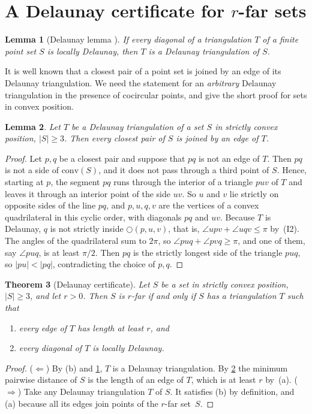 \documentclass[11pt,a4paper]{article}
\newtheorem{theorem}{Theorem}
\newtheorem{lemma}[theorem]{Lemma}
\theoremstyle{definition}
\theoremstyle{remark}
\newcommand{\conv}{\mathrm{conv}}
\newcommand{\ang}{\angle}
\newcommand{\circlethree}[3]{\bigcirc(#1,#2,#3)}
\begin{document}
\section{A Delaunay certificate for \texorpdfstring{$r$}{r}-far sets}\label{sec:certificate}

\begin{lemma}[Delaunay lemma {\cite{delaunay,edelsbrunner}}]\label{lem:delaunay}
If every diagonal of a triangulation $T$ of a finite point set $S$ is locally
Delaunay, then $T$ is a Delaunay triangulation of $S$.
\end{lemma}

It is well known that a closest pair of a point set is joined by an edge of
its Delaunay triangulation. We need the statement for an \emph{arbitrary}
Delaunay triangulation in the presence of cocircular points, and give the
short proof for sets in convex position.

\begin{lemma}\label{lem:closest}
Let $T$ be a Delaunay triangulation of a set $S$ in strictly convex position,
$|S|\ge3$. Then every closest pair of $S$ is joined by an edge of $T$.
\end{lemma}
\begin{proof}
Let $p,q$ be a closest pair and suppose that $pq$ is not an edge of $T$. Then
$pq$ is not a side of $\conv(S)$, and it does not pass through a third point
of $S$. Hence, starting at $p$, the segment $pq$ runs through the interior of
a triangle $puv$ of $T$ and leaves it through an interior point of the side
$uv$. So $u$ and $v$ lie strictly on opposite sides of the line $pq$, and
$p,u,q,v$ are the vertices of a convex quadrilateral in this cyclic order,
with diagonals $pq$ and $uv$. Because $T$ is Delaunay, $q$ is not strictly
inside $\circlethree puv$, that is, $\ang upv+\ang uqv\le\pi$ by~(I2). The
angles of the quadrilateral sum to $2\pi$, so $\ang puq+\ang pvq\ge\pi$, and
one of them, say $\ang puq$, is at least $\pi/2$. Then $pq$ is the strictly
longest side of the triangle $puq$, so $|pu|<|pq|$, contradicting the choice
of $p,q$.
\end{proof}

\begin{theorem}[Delaunay certificate]\label{thm:cert-delaunay}
Let $S$ be a set in strictly convex position, $|S|\ge3$, and let $r>0$. Then
$S$ is $r$-far if and only if $S$ has a triangulation $T$ such that
\begin{enumerate}[label=(\alph*),itemsep=0pt,topsep=2pt]
\item every edge of $T$ has length at least $r$, and
\item every diagonal of $T$ is locally Delaunay.
\end{enumerate}
\end{theorem}
\begin{proof}
($\Leftarrow$) By (b) and \cref{lem:delaunay}, $T$ is a Delaunay
triangulation. By \cref{lem:closest} the minimum pairwise distance of $S$ is
the length of an edge of $T$, which is at least $r$ by~(a).
($\Rightarrow$) Take any Delaunay triangulation $T$ of $S$. It satisfies (b)
by definition, and (a) because all its edges join points of the $r$-far
set~$S$.
\end{proof}
\end{document}
